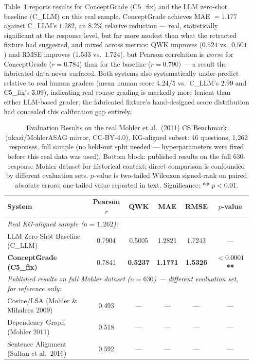 \documentclass[conference]{IEEEtran}
\begin{document}
Table~\ref{tab:main_results} reports results for ConceptGrade (C5\_fix)
and the LLM zero-shot baseline (C\_LLM) on this real sample. ConceptGrade
achieves MAE $=1.177$ against C\_LLM's $1.282$, an $8.2\%$ relative
reduction --- real, statistically significant at the response level, but
far more modest than what the retracted fixture had suggested, and mixed
across metrics: QWK improves ($0.524$ vs.\ $0.501$) and RMSE improves
($1.533$ vs.\ $1.724$), but Pearson correlation is \emph{worse} for
ConceptGrade ($r=0.784$) than for the baseline ($r=0.790$) --- a result
the fabricated data never surfaced. Both systems also systematically
under-predict relative to real human graders (mean human score $4.24/5$
vs.\ C\_LLM's $2.99$ and C5\_fix's $3.09$), indicating real course
grading is markedly more lenient than either LLM-based grader; the
fabricated fixture's hand-designed score distribution had concealed
this calibration gap entirely.

\begin{table}[t]
\caption{Evaluation Results on the real Mohler et al.\ (2011) CS Benchmark
         (nkazi/MohlerASAG mirror, CC-BY-4.0), KG-aligned subset: 46
         questions, 1{,}262 responses, full sample (no held-out split
         needed --- hyperparameters were fixed before this real data was
         used). Bottom block: published results on the full 630-response
         Mohler dataset for historical context; direct comparison is
         confounded by different evaluation sets. $p$-value is two-tailed
         Wilcoxon signed-rank on paired absolute errors; one-tailed value
         reported in text. Significance: ** $p < 0.01$.}
\label{tab:main_results}
\centering
\begin{tabular}{lccccc}
\toprule
\textbf{System} &
\textbf{Pearson $r$} &
\textbf{QWK} &
\textbf{MAE} &
\textbf{RMSE} &
\textbf{$p$-value} \\
\midrule
\multicolumn{6}{l}{\textit{Real KG-aligned sample ($n = 1{,}262$):}} \\
LLM Zero-Shot Baseline (C\_LLM) &
  0.7904 & 0.5005 & 1.2821 & 1.7243 & --- \\
\textbf{ConceptGrade (C5\_fix)} &
  0.7841 & \textbf{0.5237} & \textbf{1.1771} & \textbf{1.5326} & \textbf{$<0.0001$**} \\
\midrule
\multicolumn{6}{l}{\textit{Published results on full Mohler dataset ($n=630$) --- different evaluation set, for reference only:}} \\
\quad Cosine/LSA (Mohler \& Mihalcea 2009) \cite{mohler2009}         & 0.493 & --- & --- & --- & --- \\
\quad Dependency Graph (Mohler 2011) \cite{mohler2011}               & 0.518 & --- & --- & --- & --- \\
\quad Sentence Alignment (Sultan et al.\ 2016) \cite{sultan2016}     & 0.592 & --- & --- & --- & --- \\
\bottomrule
\end{tabular}
\end{table}
\end{document}
